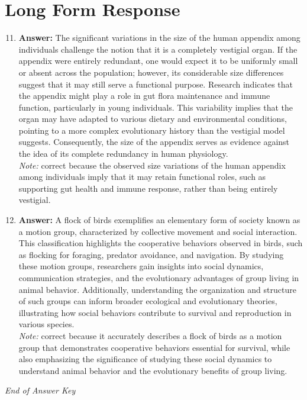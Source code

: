 \documentclass[12pt]{article}
\begin{document}
\section*{Long Form Response}
\begin{enumerate}[label=\arabic*.]
\setcounter{enumi}{10}
\item \textbf{Answer:} The significant variations in the size of the human appendix among individuals challenge the notion that it is a completely vestigial organ. If the appendix were entirely redundant, one would expect it to be uniformly small or absent across the population; however, its considerable size differences suggest that it may still serve a functional purpose. Research indicates that the appendix might play a role in gut flora maintenance and immune function, particularly in young individuals. This variability implies that the organ may have adapted to various dietary and environmental conditions, pointing to a more complex evolutionary history than the vestigial model suggests. Consequently, the size of the appendix serves as evidence against the idea of its complete redundancy in human physiology.
\\ \textit{Note:} correct because the observed size variations of the human appendix among individuals imply that it may retain functional roles, such as supporting gut health and immune response, rather than being entirely vestigial.
\item \textbf{Answer:} A flock of birds exemplifies an elementary form of society known as a motion group, characterized by collective movement and social interaction. This classification highlights the cooperative behaviors observed in birds, such as flocking for foraging, predator avoidance, and navigation. By studying these motion groups, researchers gain insights into social dynamics, communication strategies, and the evolutionary advantages of group living in animal behavior. Additionally, understanding the organization and structure of such groups can inform broader ecological and evolutionary theories, illustrating how social behaviors contribute to survival and reproduction in various species.
\\ \textit{Note:} correct because it accurately describes a flock of birds as a motion group that demonstrates cooperative behaviors essential for survival, while also emphasizing the significance of studying these social dynamics to understand animal behavior and the evolutionary benefits of group living.
\end{enumerate}

\vfill
\noindent\textit{End of Answer Key}
\end{document}
